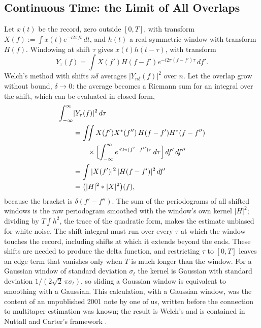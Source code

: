 \documentclass[10pt,twocolumn]{article}
\newcommand{\dd}{\,d}
\begin{document}
\subsection{Continuous Time: the Limit of All Overlaps}
Let $x(t)$ be the record, zero outside $[0,T]$, with transform $X(f):=\int x(t)e^{-i2\pi ft}\dd t$, and $h(t)$ a real symmetric window with transform $H(f)$. Windowing at shift $\tau$ gives $x(t)h(t-\tau)$, with transform
\begin{equation*}
Y_\tau(f)=\int X(f')H(f-f')e^{-i2\pi(f-f')\tau}\dd f'.
\end{equation*} Welch's method with shifts $n\delta$ averages $|Y_{n\delta}(f)|^2$ over $n$. Let the overlap grow without bound, $\delta\to0$: the average becomes a Riemann sum for an integral over the shift, which can be evaluated in closed form,
\begin{align}
\int_{-\infty}^{\infty}&|Y_\tau(f)|^2\dd\tau\notag\\
&=\iint X(f')X^{*}(f'')\,H(f-f')H^{*}(f-f'')\notag\\
&\qquad\times\Bigl[\int_{-\infty}^{\infty}e^{\,i2\pi(f'-f'')\tau}\dd\tau\Bigr]\dd f'\dd f''\notag\\
&=\int|X(f')|^2\,|H(f-f')|^2\dd f'\notag\\
&=\bigl(|H|^2*|X|^2\bigr)(f),
\label{eq:continuous}
\end{align}
because the bracket is $\delta(f'-f'')$. The sum of the periodograms of all shifted windows is the raw periodogram smoothed with the window's own kernel $|H|^2$; dividing by $T\!\int\!h^2$, the trace of the quadratic form, makes the estimate unbiased for white noise. The shift integral must run over every $\tau$ at which the window touches the record, including shifts at which it extends beyond the ends. These shifts are needed to produce the delta function, and restricting $\tau$ to $[0,T]$ leaves an edge term that vanishes only when $T$ is much longer than the window. For a Gaussian window of standard deviation $\sigma_t$ the kernel is Gaussian with standard deviation $1/(2\sqrt2\,\pi\sigma_t)$, so sliding a Gaussian window is equivalent to smoothing with a Gaussian. This calculation, with a Gaussian window, was the content of an unpublished 2001 note by one of us, written before the connection to multitaper estimation was known; the result is Welch's \cite{welch1967} and is contained in Nuttall and Carter's framework \cite{nuttall1982}.
\end{document}
